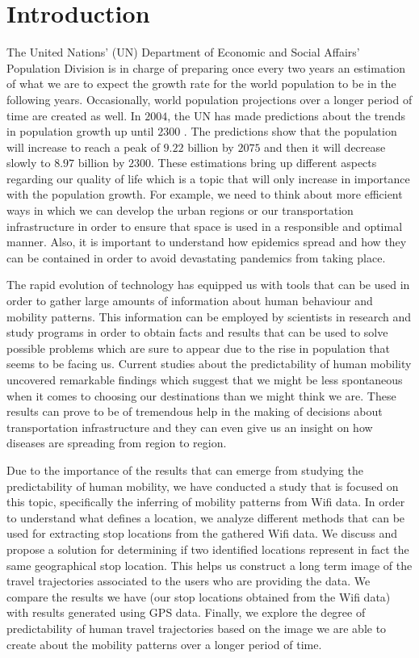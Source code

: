 \chapter{Introduction}

The United Nations' (UN) Department of Economic and Social Affairs' Population
Division is in charge of preparing once every two years an estimation of what we
are to expect the growth rate for the world population to be in the following
years. Occasionally, world population projections over a longer period of time
are created as well. In $2004$, the UN has made predictions about the trends in
population growth up until $2300$ \cite{UNWp}. The predictions show that the
population will increase to reach a peak of $9.22$ billion by  $2075$ and then
it will decrease slowly to $8.97$ billion by $2300$. These estimations bring up
different aspects regarding our quality of life which is a topic that will only
increase in importance with the population growth. For example, we need to think
about more efficient ways in which we can develop the urban regions or our
transportation infrastructure in order to ensure that space is used in a
responsible and optimal manner. Also, it is important to understand how
epidemics spread and how they can be contained in order to avoid devastating
pandemics from taking place.

The rapid evolution of technology has equipped us with tools that can be used in
order to gather large amounts of information about human behaviour and mobility
patterns. This information can be employed by scientists in research and study
programs in order to obtain facts and results that can be used to solve possible
problems which are sure to appear due to the rise in population that seems to be
facing us. Current studies about the predictability of human mobility uncovered
remarkable findings which suggest that we might be less spontaneous when it
comes to choosing our destinations than we might think we are. These results can
prove to be of tremendous help in the making of decisions about transportation
infrastructure and they can even give us an insight on how diseases are
spreading from region to region.

Due to the importance of the results that can emerge from studying the
predictability of human mobility, we have conducted a study that is focused on
this topic, specifically the inferring of mobility patterns from Wifi data. In
order to understand what defines a location, we analyze different methods that
can be used for extracting stop locations from the gathered Wifi data. We
discuss and propose a solution for determining if two identified locations
represent in fact the same geographical stop location. This helps us construct a
long term image of the travel trajectories associated to the users who are
providing the data.
We compare the results we have (our stop locations obtained from the Wifi data)
with results generated using GPS data. Finally, we explore the degree of
predictability of human travel trajectories based on the image we are able to
create about the mobility patterns over a longer period of time.

